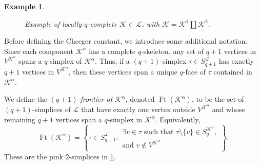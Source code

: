 \documentclass{article}
\newtheorem{example}{Example}[section]
\newcommand{\KK}{\mathcal{K}}
\newcommand{\LL}{\mathcal{L}}
\newcommand{\Ft}{\operatorname{Ft}}
\begin{document}
\begin{example}
\begin{figure}[H]
\caption{Example of locally $q$-complete $\KK\subset \LL$, with $\KK=\KK^1\coprod \KK^2$.}
\label{fig:disk}
\end{figure}
\end{example}
Before defining the Cheeger constant, we introduce some additional notation.
Since each component $\KK^\alpha$ has a complete $q$-skeleton, any set of
$q+1$ vertices in $V^{\KK^\alpha}$ spans a $q$-simplex of $\KK^\alpha$.
Thus, if a $(q+1)$-simplex $\tau\in S_{q+1}^{\LL}$ has exactly
$q+1$ vertices in $V^{\KK^\alpha}$, then these vertices span a unique
$q$-face of $\tau$ contained in $\KK^\alpha$.

We define the \emph{$(q+1)$-frontier of $\KK^\alpha$}, denoted
$\Ft(\KK^\alpha)$, to be the set of $(q+1)$-simplices of $\LL$ that have
exactly one vertex outside $V^{\KK^\alpha}$ and whose remaining $q+1$
vertices span a $q$-simplex in $\KK^\alpha$. Equivalently,
\[
\Ft(\KK^\alpha)
=
\left\{
\tau \in S_{q+1}^{\LL}
:
\begin{array}{l}
\exists v\in \tau \text{ such that }
\tau\setminus\{v\}\in S_q^{\KK^\alpha},\\
\text{and } v\notin V^{\KK^\alpha}
\end{array}
\right\}.
\]
These are the pink $2$-simplices in \cref{fig:disk}.
\end{document}
